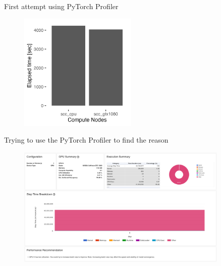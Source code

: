 \documentclass[compress,aspectratio=169]{beamer}
\begin{document}
\begin{frame}{First attempt using PyTorch Profiler}
    \begin{center}
    \begin{figure}
        \includegraphics[width=0.5\textwidth]{../../data/sacct_barplot_by_nodes_profiler-torch_sample-points}
    \end{figure}
    \end{center}
\end{frame}

\begin{frame}{Trying to use the PyTorch Profiler to find the reason}
	\vspace{-1em}
    \begin{center}
    \begin{figure}
        \includegraphics[width=0.9\textwidth]{../../data/scap_gtx1080_profiler-torch_sample-points_14628864}
    \end{figure}
    \end{center}
\end{frame}
\end{document}
